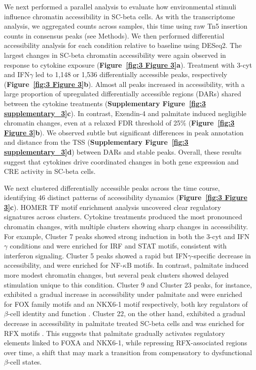 We next performed a parallel analysis to evaluate how environmental stimuli influence chromatin accessibility in SC-beta cells. As with the transcriptome analysis, we aggregated counts across samples, this time using raw Tn5 insertion counts in consensus peaks (see Methods). We then performed differential accessibility analysis for each condition relative to baseline using DESeq2. The largest changes in SC-beta chromatin accessibility were again observed in response to cytokine exposure (\textbf{Figure~\ref{fig:3 Figure 3}\textbf{a}}). Treatment with 3-cyt and IFN$\gamma$ led to 1,148 or 1,536 differentially accessible peaks, respectively (\textbf{Figure~\ref{fig:3 Figure 3}\textbf{b}}). Almost all peaks increased in accessibility, with a large proportion of upregulated differentially accessible regions (DARs) shared between the cytokine treatments (\textbf{Supplementary Figure~\ref{fig:3 supplementary_3}\textbf{c}}). In contrast, Exendin-4 and palmitate induced negligible chromatin changes, even at a relaxed FDR threshold of 25\% (\textbf{Figure~\ref{fig:3 Figure 3}\textbf{b}}). We observed subtle but significant differences in peak annotation and distance from the TSS (\textbf{Supplementary Figure~\ref{fig:3 supplementary_3}\textbf{d}}) between DARs and stable peaks. Overall, these results suggest that cytokines drive coordinated changes in both gene expression and CRE activity in SC-beta cells.

We next clustered differentially accessible peaks across the time course, identifying 46 distinct patterns of accessibility dynamics (\textbf{Figure~\ref{fig:3 Figure 3}\textbf{c}}). HOMER \cite{Heinz2010-yo} TF motif enrichment analysis uncovered clear regulatory signatures across clusters. Cytokine treatments produced the most pronounced chromatin changes, with multiple clusters showing sharp changes in accessibility. For example, Cluster 7 peaks showed strong induction in both the 3-cyt and IFN$\gamma$ conditions and were enriched for IRF and STAT motifs, consistent with interferon signaling. Cluster 5 peaks showed a rapid but IFN$\gamma$-specific decrease in accessibility, and were enriched for NF-$\kappa$B motifs. In contrast, palmitate induced more modest chromatin changes, but several peak clusters showed delayed stimulation unique to this condition. Cluster 9 and Cluster 23 peaks, for instance, exhibited a gradual increase in accessibility under palmitate and were enriched for FOX family motifs and an NKX6-1 motif respectively, both key regulators of $\beta$-cell identity and function \cite{Geusz2021-mr,Lantz2004-mi,Aigha2020-uu}. Cluster 22, on the other hand, exhibited a gradual decrease in accessibility in palmitate treated SC-beta cells and was enriched for RFX motifs \cite{Piccand2014-bd}. This suggests that palmitate gradually activates regulatory elements linked to FOXA and NKX6-1, while repressing RFX-associated regions over time, a shift that may mark a transition from compensatory to dysfunctional $\beta$-cell states.

